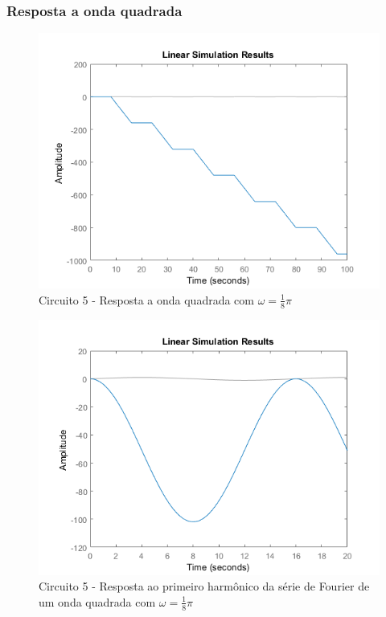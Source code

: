 \documentclass[a4paper, 12pt]{article}
\begin{document}
			\subsubsection{Resposta a onda quadrada}
			\begin{figure}[!ht]
				\centering
				\includegraphics[scale=0.71]{img/1i_circ5.png}
				\caption{Circuito 5 - Resposta a onda quadrada com $\omega = \frac{1}{8}\pi$}	
			\end{figure}			
			\begin{figure}[!ht]
				\centering
				\includegraphics[scale=0.71]{img/1j_circ5.png}
				\caption{Circuito 5 - Resposta ao primeiro harmônico da série de Fourier de um onda quadrada com $\omega = \frac{1}{8}\pi$}	
			\end{figure}		
\end{document}
